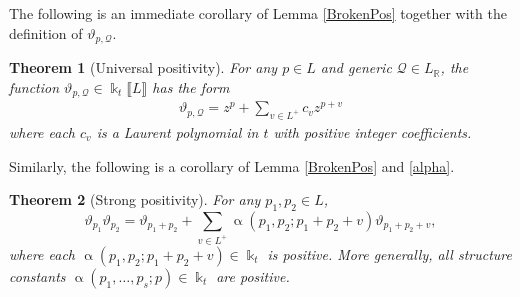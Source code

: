 \documentclass{amsart}
\let\llb=\llbracket
\let\rrb=\rrbracket
\let\bb=\mathbb
\newcommand {\kk} {\Bbbk}
\newcommand {\sQ} {\mathcal{Q}}
\renewcommand{\alpha}{\upalpha}
\theoremstyle{plain}%
\newtheorem{thm}{Theorem}[section]
\theoremstyle{definition}
\theoremstyle{remark}
\begin{document}
The following is an immediate corollary of Lemma \ref{BrokenPos} together with the definition of $\vartheta_{p,\sQ}$.

\begin{thm}[Universal positivity]\label{qPosLoc}
For any $p\in L$ and generic $\sQ\in L_{\bb{R}}$, the function $\vartheta_{p,\sQ}\in \kk_t\llb L\rrb$ has the form
\begin{align*}
    \vartheta_{p,\sQ}=z^p+ \sum_{v\in L^+} c_vz^{p+v}
\end{align*}
where each $c_v$ is a Laurent polynomial in $t$ with positive integer coefficients.
\end{thm}

Similarly, the following is a corollary of Lemma \ref{BrokenPos} and \eqref{alpha}.


\begin{thm}[Strong positivity]\label{qPosStrong}
For any $p_1,p_2\in L$, $$\vartheta_{p_1}\vartheta_{p_2}=\vartheta_{p_1+p_2}+\sum_{v\in L^+} \alpha(p_1,p_2;p_1+p_2+v) \vartheta_{p_1+p_2+v},$$
where each $\alpha(p_1,p_2;p_1+p_2+v)\in\kk_t$ is positive.  More generally, all structure constants $\alpha(p_1,\ldots,p_s;p)\in\kk_t$ are positive.
\end{thm}
\end{document}
